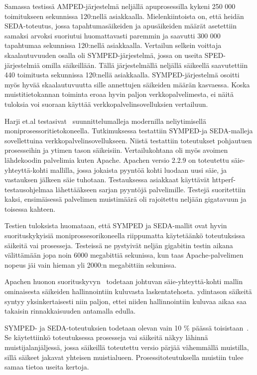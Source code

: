 \documentclass[finnish]{tktltiki2}
\theoremstyle{definition}
\theoremstyle{remark}
\begin{document}
Samassa testissä AMPED-järjestelmä neljällä apuprosessilla
kykeni 250 000 toimitukseen sekunnissa 120:nellä asiakkaalla. Mielenkiintoista on,
että heidän SEDA-toteutus, jossa tapahtumasäikeiden ja apusäikeiden
määrät asetettiin samaksi arvoksi suoriutui huomattavasti paremmin ja
saavutti 300 000 tapahtumaa sekunnissa 120:nellä asiakkaalla.
Vertailun selkein voittaja skaalautuvuuden
osalla oli SYMPED-järjestelmä, jossa on useita SPED-järjestelmiä
omilla säikeillään. Tällä järjestelmällä neljällä säikeellä
saavutettiin 440 toimitusta sekunnissa 120:nellä asiakkaalla.
SYMPED-järjestelmä osoitti myös hyvää skaalautuvuutta
sille annettujen säikeiden määrän kasvaessa.
Koska muistitietokannan toiminta eroaa
hyvin paljon verkkopalvelimesta, ei näitä
tuloksia voi suoraan käyttää verkkopalvelinsovelluksien 
vertailuun.

Harji et.al testasivat~\cite{harji_comparing_2012} suunnittelumalleja 
modernilla neliytimisellä moniprosessoritietokoneella. Tutkimuksessa
testattiin SYMPED-ja SEDA-malleja sovellettuina verkkopalvelinsovellukseen.
Niistä testattiin toteutukset pohjautuen prosesseihin ja
ytimen tason säikeisiin.
Vertailukohtana oli myös avoimen lähdekoodin palvelimia kuten Apache. Apachen 
versio 2.2.9 on toteutettu säie-yhteyttä-kohti mallilla, jossa
jokaista pyyntöä kohti luodaan uusi säie, ja vastauksen jälkeen säie tuhotaan.
Testauksessa asiakkaat käyttävät httperf-testausohjelmaa lähettääkseen
sarjan pyyntöjä palvelimille.
Testejä suoritettiin kaksi, ensimäisessä palvelimen muistimäärä
oli rajoitettu neljään gigatavuun ja toisessa kahteen.

Testien tuloksista huomataan, että SYMPED ja SEDA-mallit
ovat hyvin suorituskykyisiä moniprossesorikoneella riippumatta käytetäänkö
toteutuksissa säikeitä vai prosesseja. Testeissä ne pystyivät
neljän gigabitin testin aikana välittämään jopa noin 6000 megabittiä sekunissa,
kun taas Apache-palvelimen nopeus jäi vain hieman yli 2000:n megabittiin
sekunissa.

Apachen huonon suorituskyvyn~\cite{harji_comparing_2012} 
todetaan johtuvan säie-yhteyttä-kohti mallin
ominaisesta säikeiden hallinnointiin kuluvasta laskentatehosta.
ydintason säikeitä syntyy yksinkertaisesti niin paljon,
ettei niiden hallinnointiin kuluvaa aikaa saa 
takaisin rinnakkaisuuden antamalla edulla.

SYMPED- ja SEDA-toteutuksien todetaan olevan vain 10 $\%$ päässä
toisistaan~\cite{harji_comparing_2012}. Se käytettiinkö toteutuksessa
prosesseja vai säikeitä
näkyy lähinnä muistijalanjäljessä, jossa säikeillä toteutettu versio
pärjää vähemmällä muistilla, sillä säikeet jakavat
yhteisen muistialueen. Prosessitoteutuksella muistiin tulee
samaa tietoa useita kertoja.
\end{document}
